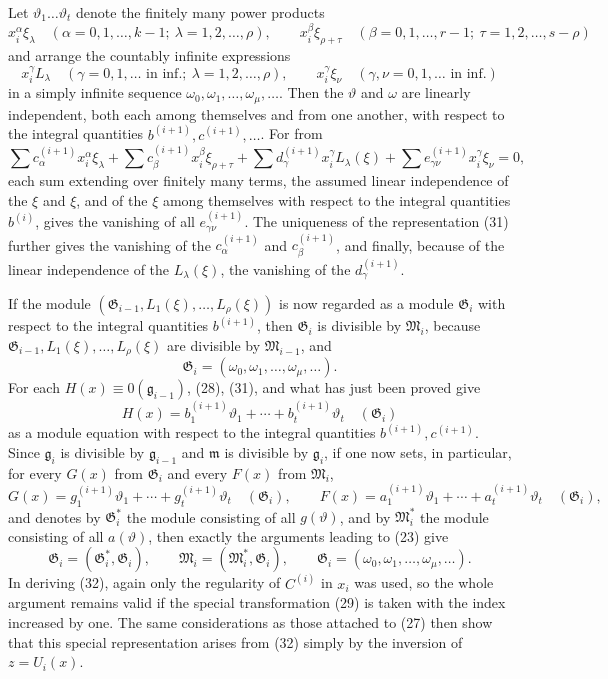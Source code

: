 \documentclass[11pt]{article}
\providecommand{\Gmod}{\mathfrak G}
\providecommand{\Mmod}{\mathfrak M}
\providecommand{\mideal}{\mathfrak m}
\providecommand{\gideal}{\mathfrak g}
\begin{document}
Let $\vartheta_1\ldots\vartheta_t$ denote the finitely many power products
\[
 x_i^\alpha\xi_\lambda\quad(\alpha=0,1,\ldots,k-1;\ \lambda=1,2,\ldots,\rho),\qquad
 x_i^\beta\xi_{\rho+\tau}\quad(\beta=0,1,\ldots,r-1;\ \tau=1,2,\ldots,s-\rho)
\]
and arrange the countably infinite expressions
\[
 x_i^\gamma L_\lambda\quad(\gamma=0,1,\ldots\text{ in inf.};\ \lambda=1,2,\ldots,\rho),
 \qquad
 x_i^\gamma\xi_\nu\quad(\gamma,
\nu=0,1,
\ldots\text{ in inf.})
\]
in a simply infinite sequence $\omega_0,\omega_1,\ldots,\omega_\mu,\ldots$. Then the $\vartheta$ and $\omega$ are linearly independent, both each among themselves and from one another, with respect to the integral quantities $b^{(i+1)},c^{(i+1)},\ldots$. For from
\[
 \sum c^{(i+1)}_\alpha x_i^\alpha\xi_\lambda+
 \sum c^{(i+1)}_\beta x_i^\beta\xi_{\rho+\tau}+
 \sum d^{(i+1)}_\gamma x_i^\gamma L_\lambda(\xi)+
 \sum e^{(i+1)}_{\gamma\nu}x_i^\gamma\xi_\nu=0,
\]
each sum extending over finitely many terms, the assumed linear independence of the $\xi$ and $\xi$, and of the $\xi$ among themselves with respect to the integral quantities $b^{(i)}$, gives the vanishing of all $e^{(i+1)}_{\gamma\nu}$. The uniqueness of the representation (31) further gives the vanishing of the $c^{(i+1)}_\alpha$ and $c^{(i+1)}_\beta$, and finally, because of the linear independence of the $L_\lambda(\xi)$, the vanishing of the $d^{(i+1)}_\gamma$.

If the module $(\Gmod_{i-1},L_1(\xi),\ldots,L_\rho(\xi))$ is now regarded as a module $\Gmod_i$ with respect to the integral quantities $b^{(i+1)}$, then $\Gmod_i$ is divisible by $\Mmod_i$, because $\Gmod_{i-1},L_1(\xi),\ldots,L_\rho(\xi)$ are divisible by $\Mmod_{i-1}$, and
\[
 \Gmod_i=(\omega_0,\omega_1,\ldots,\omega_\mu,\ldots).
\]
For each $H(x)\equiv0(\gideal_{i-1})$, (28), (31), and what has just been proved give
\[
 H(x)=b^{(i+1)}_1\vartheta_1+\cdots+b^{(i+1)}_t\vartheta_t\quad(\Gmod_i)
\]
as a module equation with respect to the integral quantities $b^{(i+1)},c^{(i+1)}$. Since $\gideal_i$ is divisible by $\gideal_{i-1}$ and $\mideal$ is divisible by $\gideal_i$, if one now sets, in particular, for every $G(x)$ from $\Gmod_i$ and every $F(x)$ from $\Mmod_i$,
\[
 G(x)=g^{(i+1)}_1\vartheta_1+\cdots+g^{(i+1)}_t\vartheta_t\quad(\Gmod_i),
 \qquad
 F(x)=a^{(i+1)}_1\vartheta_1+\cdots+a^{(i+1)}_t\vartheta_t\quad(\Gmod_i),
\]
and denotes by $\Gmod_i^*$ the module consisting of all $g(\vartheta)$, and by $\Mmod_i^*$ the module consisting of all $a(\vartheta)$, then exactly the arguments leading to (23) give
\begin{equation}
 \Gmod_i=(\Gmod_i^*,\Gmod_i),\qquad
 \Mmod_i=(\Mmod_i^*,\Gmod_i),\qquad
 \Gmod_i=(\omega_0,\omega_1,\ldots,\omega_\mu,\ldots).
\tag{32}
\end{equation}
In deriving (32), again only the regularity of $C^{(i)}$ in $x_i$ was used, so the whole argument remains valid if the special transformation (29) is taken with the index increased by one. The same considerations as those attached to (27) then show that this special representation arises from (32) simply by the inversion of $z=U_i(x)$.
\end{document}
